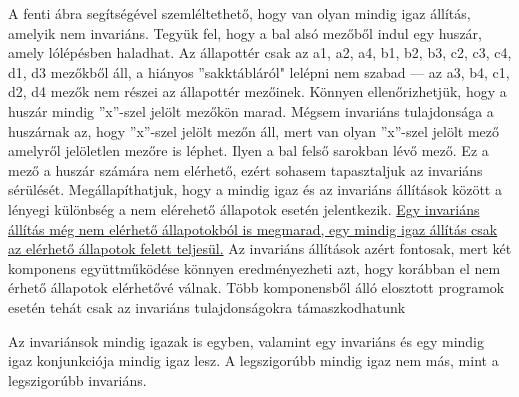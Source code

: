 \documentclass{article}
\begin{document}
\begin{center}
\def\mylist{na1}
\setchessboard{setpieces=\mylist,showmover=false}
\chessboard[
border=false,
maxfield=d4,
linewidth=0.05em,
pgfstyle=cross,
backfields={c2,b3,a1},
pgfstyle=cross,
color=red,
backfields={a4},
color=white,
color=black,
linewidth=0.05ex,
pgfstyle=border, backregion={a4-a4,d1-d1},
pgfstyle=lefttopborder, backregion={b3-b3,a2-a2,c1-c1,c4-c4, d2-d2},
pgfstyle=bottomborder, backregion={a1-b1},
pgfstyle=leftborder, backregion={a1-a1},
pgfstyle=rightborder, backregion={d3-d3},
pgfstyle=bottomleftborder, backregion={d4-d4},
color=red,
linewidth=0.15ex,
pgfstyle={[clockwise=true,style=knight]curvemove},
markmoves=a4-c3]
\end{center}

A fenti ábra segítségével szemléltethető, hogy van olyan mindig igaz állítás, amelyik nem invariáns. Tegyük fel, hogy a bal alsó mezőből indul egy huszár, amely lólépésben haladhat. Az állapottér csak az a1, a2, a4, b1, b2, b3, c2, c3, c4, d1, d3 mezőkből áll, a hiányos ”sakktábláról" lelépni nem szabad --- az a3, b4, c1, d2, d4 mezők nem részei az állapottér mezőinek. Könnyen ellenőrizhetjük, hogy a huszár mindig ”x”-szel jelölt mezőkön marad. Mégsem invariáns tulajdonsága a huszárnak az, hogy ”x”-szel jelölt mezőn áll, mert van olyan ”x”-szel jelölt mező amelyről jelöletlen mezőre is léphet. Ilyen a bal felső sarokban lévő mező. Ez a mező a huszár számára nem elérhető, ezért sohasem tapasztaljuk az invariáns sérülését. Megállapíthatjuk, hogy a mindig igaz és az invariáns állítások között a lényegi különbség a nem elérehető állapotok esetén jelentkezik. \uline{Egy invariáns állítás még nem elérhető állapotokból is megmarad, egy mindig igaz állítás csak az elérhető állapotok felett teljesül.} Az invariáns állítások azért fontosak, mert két komponens együttműködése könnyen eredményezheti azt, hogy korábban el nem érhető állapotok elérhetővé válnak. Több komponensből álló elosztott programok esetén tehát csak az invariáns tulajdonságokra támaszkodhatunk

Az invariánsok mindig igazak is egyben, valamint egy invariáns és egy mindig igaz konjunkciója mindig igaz lesz. A
legszigorúbb mindig igaz nem más, mint a legszigorúbb invariáns.
\end{document}
